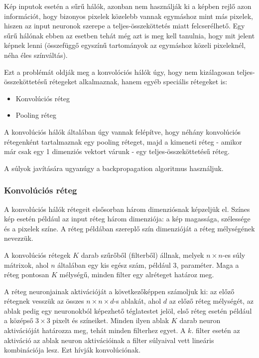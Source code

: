 \documentclass[12pt]{article}
\begin{document}
Kép inputok esetén a sűrű hálók, azonban nem használják ki a képben rejlő azon információt, hogy bizonyos pixelek közelebb vannak egymáshoz mint más pixelek, hiszen az input neuronok szerepe a teljes-összeköttetés miatt felcserélhető. Egy sűrű hálónak ebben az esetben tehát még azt is meg kell tanulnia, hogy mit jelent képnek lenni (összefüggő egyszínű tartományok az egymáshoz közeli pixeleknél, néha éles színváltás).

Ezt a problémát oldják meg a konvolóciós hálók úgy, hogy nem kizálagosan teljes-összeköttetésű rétegeket alkalmaznak, hanem egyéb speciális rétegeket is:

\begin{itemize}
  \item Konvolúciós réteg
  \item Pooling réteg
\end{itemize}

A konvolúciós hálók általában úgy vannak felépítve, hogy néhány konvolúciós rétegenként tartalmaznak egy pooling réteget, majd a kimeneti réteg - amikor már csak egy 1 dimenziós vektort várunk - egy teljes-összeköttetésű réteg.

A súlyok javítására ugyanúgy a backpropagation algoritmus használjuk.

\subsubsection{Konvolúciós réteg}

A konvolúciós hálók rétegeit elsősorban három dimenziósnak képzeljük el. Színes kép esetén például az input réteg három dimenziója: a kép magassága, szélessége és a pixelek színe. A réteg példában szereplő szín dimenzióját a réteg mélységének nevezzük.

A konvolúciós rétegek $K$ darab szűrőből (filterből) állnak, melyek $n\times n$-es súly mátrixok, ahol $n$ általában egy kis egész szám, például 3, paraméter. Maga a réteg pontosan $K$ mélységű, minden filter egy alréteget határoz meg.

A réteg neuronjainak aktivációját a következőképpen számoljuk ki: az előző rétegnek vesszük az összes $n\times n\times d$-s ablakát, ahol $d$ az előző réteg mélységét, az ablak pedig egy neuronokból képezhető téglatestet jelöl, első réteg esetén például a középső $3\times3$ pixelt és színeiket. Minden ilyen ablak $K$ darab neuron aktivációját határozza meg, tehát minden filterhez egyet. A $k$. filter esetén az aktiváció az ablak neuron aktivációinak a filter súlyaival vett lineáris kombinációja lesz. Ezt hívják konvolúciónak.
\end{document}
